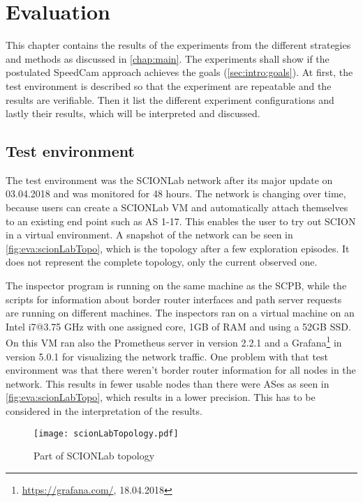 \documentclass[thesis.tex]{subfiles}
\begin{document}
\chapter{Evaluation}\label{chap:eva}

This chapter contains the results of the experiments from the different strategies and methods as discussed in \autoref{chap:main}. The experiments shall show if the postulated SpeedCam approach achieves the goals (\autoref{sec:intro:goals}). At first, the test environment is described so that the experiment are repeatable and the results are verifiable. Then it list the different experiment configurations and lastly their results, which will be interpreted and discussed.

\section{Test environment}
The test environment was the SCIONLab network after its major update on 03.04.2018 and was monitored for 48 hours. The network is changing over time, because users can create a SCIONLab VM and automatically attach themselves to an existing end point such as AS 1-17. This enables the user to try out SCION in a virtual environment. A snapshot of the network can be seen in \autoref{fig:eva:scionLabTopo}, which is the topology after a few exploration episodes. It does not represent the complete topology, only the current observed one. 

The inspector program is running on the same machine as the SCPB, while the scripts for information about border router interfaces and path server requests are running on different machines. The inspectors ran on a virtual machine on an Intel i7@3.75 GHz with one assigned core, 1GB of RAM and using a 52GB SSD. On this VM ran also the Prometheus server in version 2.2.1 and a Grafana\footnote{{\url{https://grafana.com/}, 18.04.2018}} in version 5.0.1 for visualizing the network traffic. One problem with that test environment was that there weren't border router information for all nodes in the network. This results in fewer usable nodes than there were ASes as seen in \autoref{fig:eva:scionLabTopo}, which results in a lower precision. This has to be considered in the interpretation of the results.

\begin{figure}
	\centering
	\texttt{[image: scionLabTopology.pdf]}
	\caption{Part of SCIONLab topology}
	\label{fig:eva:scionLabTopo}
\end{figure}
\end{document}
